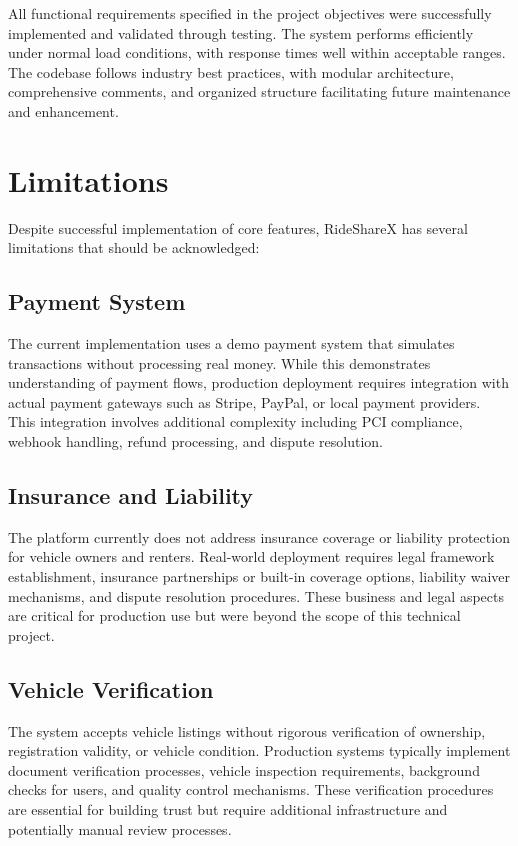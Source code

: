 \documentclass[12pt,a4paper]{report}
\begin{document}
	All functional requirements specified in the project objectives were successfully implemented and validated through testing. The system performs efficiently under normal load conditions, with response times well within acceptable ranges. The codebase follows industry best practices, with modular architecture, comprehensive comments, and organized structure facilitating future maintenance and enhancement.
	
	\section{Limitations}
	
	Despite successful implementation of core features, RideShareX has several limitations that should be acknowledged:
	
	\subsection{Payment System}
	
	The current implementation uses a demo payment system that simulates transactions without processing real money. While this demonstrates understanding of payment flows, production deployment requires integration with actual payment gateways such as Stripe, PayPal, or local payment providers. This integration involves additional complexity including PCI compliance, webhook handling, refund processing, and dispute resolution.
	
	\subsection{Insurance and Liability}
	
	The platform currently does not address insurance coverage or liability protection for vehicle owners and renters. Real-world deployment requires legal framework establishment, insurance partnerships or built-in coverage options, liability waiver mechanisms, and dispute resolution procedures. These business and legal aspects are critical for production use but were beyond the scope of this technical project.
	
	\subsection{Vehicle Verification}
	
	The system accepts vehicle listings without rigorous verification of ownership, registration validity, or vehicle condition. Production systems typically implement document verification processes, vehicle inspection requirements, background checks for users, and quality control mechanisms. These verification procedures are essential for building trust but require additional infrastructure and potentially manual review processes.
	
\end{document}

